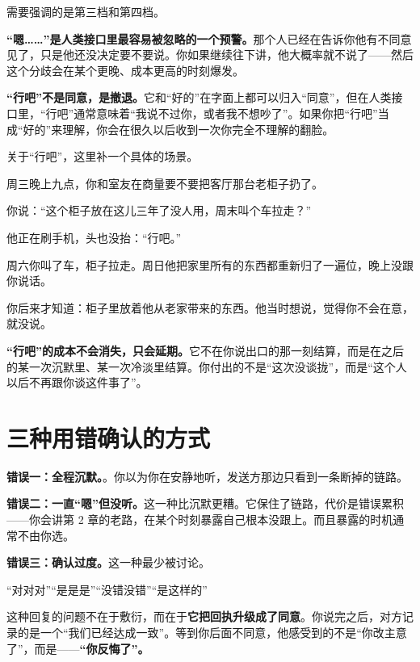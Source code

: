 需要强调的是第三档和第四档。

\textbf{“嗯……”是人类接口里最容易被忽略的一个预警。}那个人已经在告诉你他有不同意见了，只是他还没决定要不要说。你如果继续往下讲，他大概率就不说了——然后这个分歧会在某个更晚、成本更高的时刻爆发。

\textbf{“行吧”不是同意，是撤退。}它和“好的”在字面上都可以归入“同意”，但在人类接口里，“行吧”通常意味着“我说不过你，或者我不想吵了”。如果你把“行吧”当成“好的”来理解，你会在很久以后收到一次你完全不理解的翻脸。

关于“行吧”，这里补一个具体的场景。

\par
\begin{mdquote}
周三晚上九点，你和室友在商量要不要把客厅那台老柜子扔了。

你说：“这个柜子放在这儿三年了没人用，周末叫个车拉走？”

他正在刷手机，头也没抬：“行吧。”

周六你叫了车，柜子拉走。周日他把家里所有的东西都重新归了一遍位，晚上没跟你说话。

你后来才知道：柜子里放着他从老家带来的东西。他当时想说，觉得你不会在意，就没说。
\end{mdquote}

\textbf{“行吧”的成本不会消失，只会延期。}它不在你说出口的那一刻结算，而是在之后的某一次沉默里、某一次冷淡里结算。你付出的不是“这次没谈拢”，而是“这个人以后不再跟你谈这件事了”。

\section{三种用错确认的方式}

\textbf{错误一：全程沉默。}。你以为你在安静地听，发送方那边只看到一条断掉的链路。

\textbf{错误二：一直“嗯”但没听。}这一种比沉默更糟。它保住了链路，代价是错误累积——你会讲第 2 章的老路，在某个时刻暴露自己根本没跟上。而且暴露的时机通常不由你选。

\textbf{错误三：确认过度。}这一种最少被讨论。

\begin{mdquote}
“对对对”“是是是”“没错没错”“是这样的”
\end{mdquote}

这种回复的问题不在于敷衍，而在于\textbf{它把回执升级成了同意}。你说完之后，对方记录的是一个“我们已经达成一致”。等到你后面不同意，他感受到的不是“你改主意了”，而是——\textbf{“你反悔了”。}

